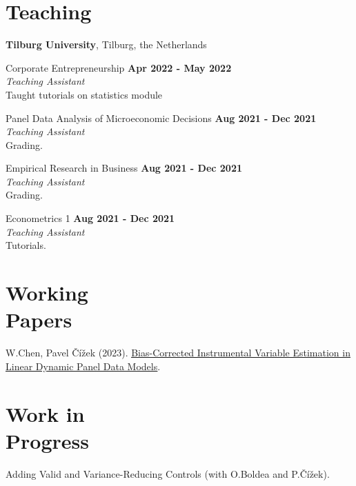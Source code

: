 \documentclass[margin,line]{res}
\begin{document}
\begin{resume}
\section{\sc Teaching}
{\bf Tilburg University}, Tilburg, the Netherlands

\vspace{-.3cm}
Corporate Entrepreneurship \hfill {\bf Apr 2022 - May 2022}\\
 {\em Teaching Assistant}\\
Taught tutorials on statistics module

\vspace{-.3cm}
Panel Data Analysis of Microeconomic Decisions \hfill {\bf Aug 2021 - Dec 2021}\\
{\em Teaching Assistant}\\
Grading.

\vspace{-.3cm}
Empirical Research in Business \hfill {\bf Aug 2021 - Dec 2021}\\
{\em Teaching Assistant}\\
Grading.

\vspace{-.3cm}
Econometrics 1 \hfill {\bf Aug 2021 - Dec 2021}\\
{\em Teaching Assistant}\\
Tutorials.


\section{\sc Working \\ Papers}
W.Chen, Pavel \v{C}\'{i}\v{z}ek (2023). \href{https://pure.uvt.nl/ws/portalfiles/portal/82271980/2023-028.pdf}{\uline{Bias-Corrected Instrumental Variable Estimation in Linear Dynamic Panel Data Models}}.



\section{\sc Work in \\ Progress}
Adding Valid and Variance-Reducing Controls (with O.Boldea and P.\v{C}\'{i}\v{z}ek).


\end{resume}
\end{document}
